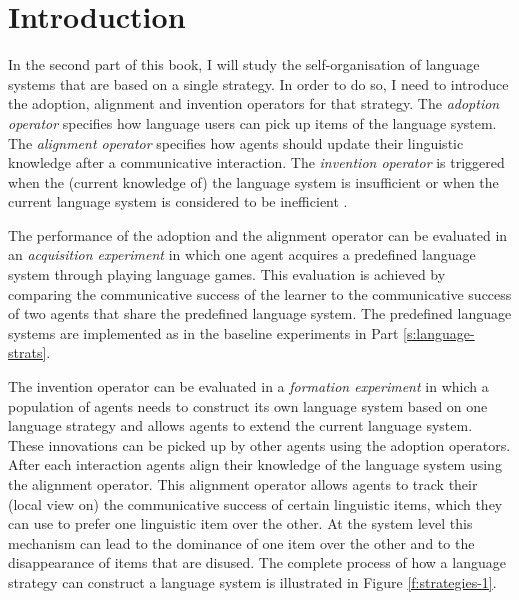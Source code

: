 \section*{Introduction}

\addtocounter{chapter}{1}
\setcounter{figure}{0}

In the second part of this book, I will study the self-organisation of
language systems that are based on a single strategy. In order to do
so, I need to introduce the adoption, alignment and invention
operators for that strategy. The \emph{adoption operator}
specifies how language users can pick up items of the language
system. The \emph{alignment operator}
specifies how agents should
update their linguistic knowledge after a communicative
interaction. The \emph{invention operator}
is triggered when the
(current knowledge of) the language system is insufficient or when the
current language system is considered to be inefficient
\citep{steels06how}.

The performance of the adoption and the alignment operator can be
evaluated in an \emph{acquisition experiment} 
in which one agent
acquires a predefined language system through playing language games.
This evaluation is achieved by comparing the communicative success of the
learner to the communicative success of two agents that share the
predefined language system. The predefined language systems are
implemented as in the baseline experiments in Part
\ref{s:language-strats}.

The invention operator can be evaluated in a \emph{formation
  experiment} in which a population of
agents needs to construct its own language system based on one
language strategy and allows agents to extend the current language
system. These innovations can be picked up by other agents using the
adoption operators. After each interaction agents align their
knowledge of the language system using the alignment operator. This
alignment operator allows agents to track their (local view on) the
communicative success of certain linguistic items, which they can use
to prefer one linguistic item over the other. At the system level this
mechanism can lead to the dominance of one item over the other and to
the disappearance of items that are disused. The complete process of
how a language strategy can construct a language system is illustrated
in Figure \ref{f:strategies-1}.

